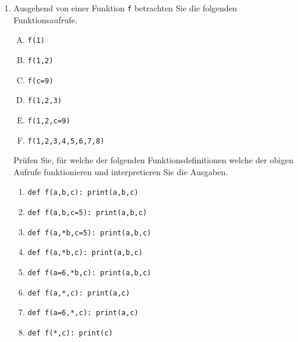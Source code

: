 \begin{enumerate}
    \item
        Ausgehend von einer Funktion \lstinline{f} betrachten Sie die folgenden Funktionsaufrufe.
        \begin{multicols}{2}
\begin{enumerate}[(A)]
    \item \lstinline{f(1)}
    \item \lstinline{f(1,2)}
    \item \lstinline{f(c=9)}
    \item \lstinline{f(1,2,3)}
    \item \lstinline{f(1,2,c=9)}
    \item \lstinline{f(1,2,3,4,5,6,7,8)}
\end{enumerate}
    \end{multicols}\vspace{-0.5em}
        Prüfen Sie, für welche der folgenden Funktionsdefinitionen welche der obigen Aufrufe funktionieren und interpretieren Sie die Ausgaben.
    \begin{multicols}{2}
\begin{enumerate}
    \item \lstinline{def f(a,b,c): print(a,b,c)}
    \item \lstinline{def f(a,b,c=5): print(a,b,c)}
    \item \lstinline{def f(a,*b,c=5): print(a,b,c)}
    \item \lstinline{def f(a,*b,c): print(a,b,c)}
    \item \lstinline{def f(a=6,*b,c): print(a,b,c)}
    \item \lstinline{def f(a,*,c): print(a,c)}
    \item \lstinline{def f(a=6,*,c): print(a,c)}
    \item \lstinline{def f(*,c): print(c)}
\end{enumerate}
    \end{multicols}        
\end{enumerate}

